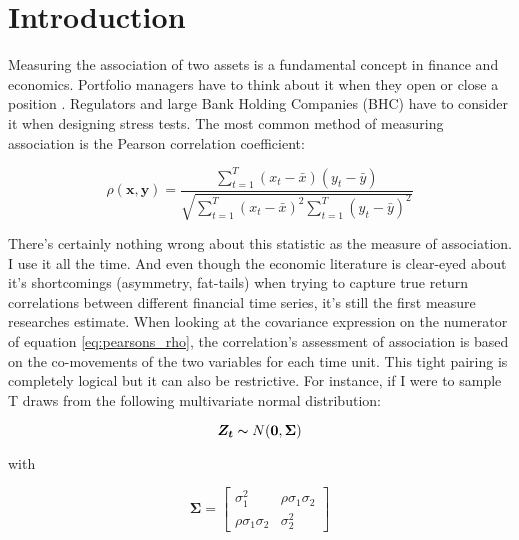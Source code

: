 \documentclass[12pt]{article}
\begin{document}
\section{Introduction}

Measuring the association of two assets is a fundamental concept in finance and economics. Portfolio managers have to think about it when they open or close a position \cite{Markowitz1952PortfolioSelection, sharpe1963simplified}. Regulators and large Bank Holding Companies (BHC) have to consider it when designing stress tests. The most common method of measuring association is the Pearson correlation coefficient:

\begin{equation}
\rho(\boldsymbol{x}, \boldsymbol{y}) = \frac{ \sum_{t=1}^{T} (x_{t} - \bar{x}) (y_{t} - \bar{y})}{ \sqrt{\sum_{t=1}^{T} (x_{t} - \bar{x})^{2} \sum_{t=1}^{T} (y_{t} - \bar{y})^{2}}}
\end{equation}

There's certainly nothing wrong about this statistic as the measure of association. I use it all the time. And even though the economic literature is clear-eyed about it's shortcomings (asymmetry, fat-tails) when trying to capture true return correlations between different financial time series, it's still the first measure researches estimate. When looking at the covariance expression on the numerator of equation \ref{eq:pearsons_rho}, the correlation's assessment of association is based on the co-movements of the two variables for each time unit. This tight pairing is completely logical but it can also be restrictive. For instance, if I were to sample T draws from the following multivariate normal distribution:

\begin{equation}
    \boldsymbol{Z_{t}} \thicksim N(\boldsymbol{0}, \boldsymbol{\Sigma})
\end{equation}

with 

\begin{equation}
    \boldsymbol{\Sigma} = \begin{bmatrix}
        \sigma_{1}^{2}             & \rho \sigma_{1}\sigma_{2} \\
        \rho \sigma_{1} \sigma_{2} & \sigma_{2}^{2} 
    \end{bmatrix}
\end{equation}
\end{document}

